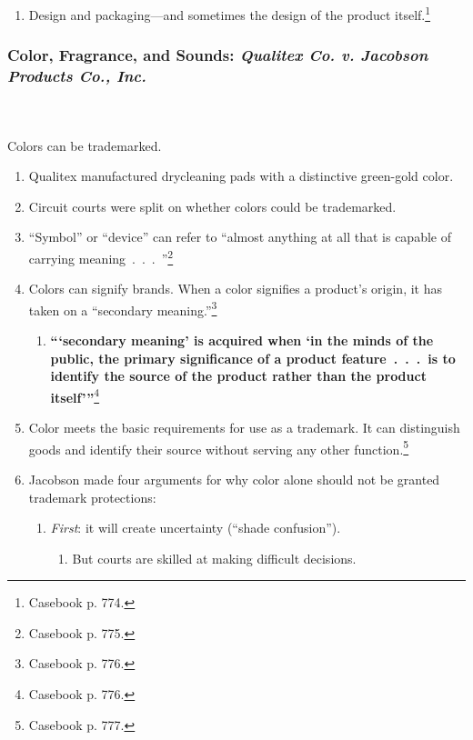 \begin{enumerate}
    \item Design and packaging---and sometimes the design of the product 
    itself.\footnote{Casebook p. 774.}
\end{enumerate}

\subsubsection{Color, Fragrance, and Sounds: \emph{Qualitex Co. v. Jacobson 
Products Co., Inc.}}
~\\\\
Colors can be trademarked.

\begin{enumerate}
    \item Qualitex manufactured drycleaning pads with a distinctive green-gold 
    color.
    \item Circuit courts were split on whether colors could be trademarked.
    \item ``Symbol'' or ``device'' can refer to ``almost anything at all that 
    is capable of carrying meaning~.~.~.~''\footnote{Casebook p. 775.}
    \item Colors can signify brands. When a color signifies a product's 
    origin, it has taken on a ``secondary meaning.''\footnote{Casebook p. 776.}
    \begin{enumerate}
        \item \textbf{\enquote{\enquote{secondary meaning} is acquired when 
        \enquote{in the minds of the public, the primary significance of a 
        product feature~.~.~.~is to identify the source of the product rather 
        than the product itself}}}\footnote{Casebook p. 776.}
    \end{enumerate}
    \item Color meets the basic requirements for use as a trademark. It 
    can distinguish goods and identify their source without serving any other 
    function.\footnote{Casebook p. 777.}
    \item Jacobson made four arguments for why color alone should not be 
    granted trademark protections:
    \begin{enumerate}
        \item \emph{First}: it will create uncertainty (``shade confusion'').
        \begin{enumerate}
            \item But courts are skilled at making difficult decisions.

\end{enumerate}
\end{enumerate}
\end{enumerate}
